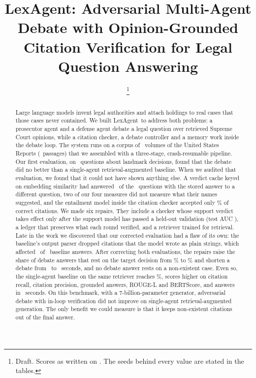 \documentclass[conference]{IEEEtran}
\newcommand{\sys}{LexAgent}
\begin{document}
\title{LexAgent: Adversarial Multi-Agent Debate with Opinion-Grounded Citation Verification for Legal Question Answering}

\author{
%
\thanks{Draft. Scores as written on \ResPaScoresWritten. The seeds behind every value are stated in the tables.}}

\maketitle

\begin{abstract}
Large language models invent legal authorities and attach holdings to real cases that those cases never contained. We built \sys\ to address both problems: a prosecutor agent and a defense agent debate a legal question over retrieved Supreme Court opinions, while a citation checker, a debate controller and a memory work inside the debate loop. The system runs on a corpus of \ResCorpusVolumes\ volumes of the United States Reports (\ResCorpusChunks\ passages) that we assembled with a three-stage, crash-resumable pipeline. Our first evaluation, on \ResTestCases\ questions about landmark decisions, found that the debate did no better than a single-agent retrieval-augmented baseline. When we audited that evaluation, we found that it could not have shown anything else. A verdict cache keyed on embedding similarity had answered \ResAudCacheBench\ of the \ResTestCases\ questions with the stored answer to a different question, two of our four measures did not measure what their names suggested, and the entailment model inside the citation checker accepted only \ResStressCorrectAcceptedPct\% of correct citations. We made six repairs. They include a checker whose support verdict takes effect only after the support model has passed a held-out validation (test AUC \ResGateTestAUC), a ledger that preserves what each round verified, and a retriever trained for retrieval. Late in the work we discovered that our corrected evaluation had a flaw of its own: the baseline's output parser dropped citations that the model wrote as plain strings, which affected \ResParseChangedTotal\ of \ResParseAnswersTotal\ baseline answers. After correcting both evaluations, the repairs raise the share of debate answers that rest on the target decision from \ResPaOldTargetAnswer\% to \ResPaFinalTargetAnswer\% and shorten a debate from \ResPaOldSecondsPerCase\ to \ResPaFinalSecondsPerCase\ seconds, and no debate answer rests on a non-existent case. Even so, the single-agent baseline on the same retriever reaches \ResPaBaseFourRTargetAnswer\%, scores higher on citation recall, citation precision, grounded answers, ROUGE-L and BERTScore, and answers in \ResPaBaseFourRSecondsPerCase\ seconds. On this benchmark, with a 7-billion-parameter generator, adversarial debate with in-loop verification did not improve on single-agent retrieval-augmented generation. The only benefit we could measure is that it keeps non-existent citations out of the final answer.

\end{abstract}
\end{document}
